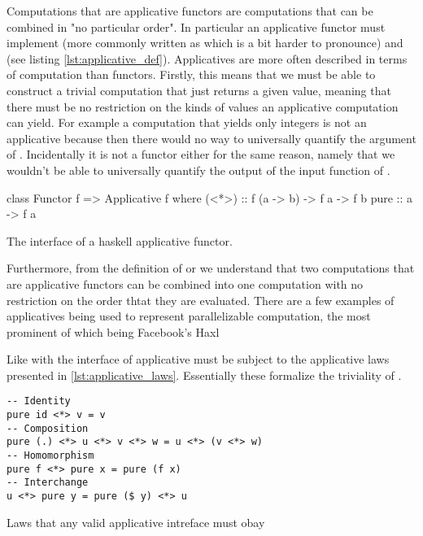   Computations that are applicative
  \cite{mcbrideApplicativeProgrammingEffects2008} functors are
  computations that can be combined in "no particular order". In
  particular an applicative functor must implement  (more commonly written as \hask{<*>} which is a bit
  harder to pronounce) and  (see listing
  \ref{lst:applicative_def}). Applicatives are more often described in
  terms of computation than functors. Firstly, this means that we must
  be able to construct a trivial computation that just returns a given
  value, meaning that there must be no restriction on the kinds of
  values an applicative computation can yield. For example a computation
  that yields only integers is not an applicative because then there
  would no way to universally quantify the argument of
  . Incidentally it is not a functor either for the same
  reason, namely that we wouldn't be able to universally quantify the
  output of the input function of .

  \begin{code}
\begin{haskellcode}
class Functor f => Applicative f  where
  (<*>) :: f (a -> b) -> f a -> f b
  pure :: a -> f a
\end{haskellcode}
    \caption{\label{lst:applicative_def}The interface of a haskell applicative functor.}
  \end{code}

  Furthermore, from the definition of  or \hask{<*>} we
  understand that two computations that are applicative functors can be
  combined into one computation with no restriction on the order thtat
  they are evaluated. There are a few examples of applicatives being
  used to represent parallelizable computation, the most prominent of
  which being Facebook's Haxl \cite{marlowHaxlProjectFacebook2013}

  Like with  the interface of applicative must be subject
  to the applicative laws presented in
  \ref{lst:applicative_laws}. Essentially these formalize the triviality
  of .

  \begin{code}
\begin{verbatim}
-- Identity
pure id <*> v = v
-- Composition
pure (.) <*> u <*> v <*> w = u <*> (v <*> w)
-- Homomorphism
pure f <*> pure x = pure (f x)
-- Interchange
u <*> pure y = pure ($ y) <*> u
\end{verbatim}
    \caption{\label{lst:applicative_laws}Laws that any valid applicative
      intreface must obay}
  \end{code}


